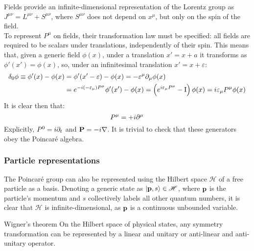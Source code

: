Fields provide an infinite-dimensional representation of the Lorentz group as $ J^{\mu \nu} = L^{\mu \nu} + S^{\mu \nu} $, where $ S^{\mu \nu} $ does not depend on $ x^\mu $, but only on the spin of the field.\\
To represent $ P^\mu $ on fields, their transformation law must be specified: all fields are required to be scalars under translations, independently of their spin. This means that, given a generic field $ \phi(x) $, under a translation $ x' = x + a $ it transforms as $ \phi'(x') = \phi(x) $, so, under an infinitesimal translation $ x' = x + \varepsilon $:
\begin{equation*}
  \begin{split}
    \delta_0 \phi \equiv \phi'(x) - \phi(x) &= \phi'(x' - \varepsilon) - \phi(x) = - \varepsilon^\mu \partial_\mu \phi(x) \\
                                            &= e^{-i (-\varepsilon_\mu) P^\mu} \phi'(x') - \phi(x) = \left( e^{i \varepsilon_\mu P^\mu} - \mathrm{I} \right) \phi(x) = i \varepsilon_\mu P^\mu \phi(x)
  \end{split}
\end{equation*}
It is clear then that:
\begin{equation}
  P^\mu = +i \partial^\mu
  \label{eq:1.51}
\end{equation}
Explicitly, $ P^0 = i \partial_t $ and $ \mathbf{P} = - i \nabla $. It is trivial to check that these generators obey the Poincaré algebra.

\subsubsection{Particle representations}

The Poincaré group can also be represented using the Hilbert space $ \mathscr{H} $ of a free particle as a basis. Denoting a generic state as $ \ket{\mathbf{p},s} \in \mathscr{H} $, where $ \mathbf{p} $ is the particle's momentum and $ s $ collectively labels all other quantum numbers, it is clear that $ \mathscr{H} $ is infinite-dimensional, as $ \mathbf{p} $ is a continuous unbounded variable.

\begin{theorem}{Wigner's theorem}{}
  On the Hilbert space of physical states, any symmetry transformation can be represented by a linear and unitary or anti-linear and anti-unitary operator.
\end{theorem}

